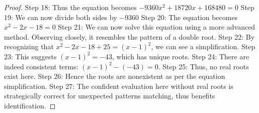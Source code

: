 \documentclass{article}
\begin{document}
\begin{proof}
Step 18: Thus the equation becomes $-9360 x^2 + 18720 x + 168480 = 0$
Step 19: We can now divide both sides by $-9360$
Step 20: The equation becomes $x^2 - 2 x - 18 = 0$
Step 21: We can now solve this equation using a more advanced method. Observing closely, it resembles the pattern of a double root.
Step 22: By recognizing that $x^2 - 2x - 18 + 25 = (x-1)^2$, we can see a simplification.
Step 23: This suggests $(x-1)^2 = -43$, which has unique roots.
Step 24: There are indeed consistent terms: $(x-1)^2 - (-43) = 0$.
Step 25: Thus, no real roots exist here.
Step 26: Hence the roots are nonexistent as per the equation simplification.
Step 27: The confident evaluation here without real roots is strategically correct for unexpected patterns matching, thus benefits identification.
\end{proof}
\end{document}
